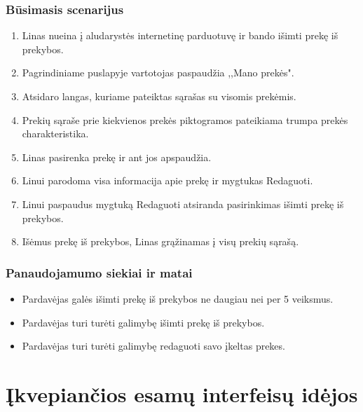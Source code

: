 \documentclass[oneside]{VUMIFPSkursinis}
\begin{document}
		\subsubsection{Būsimasis scenarijus}
			\begin{enumerate}
				\item{Linas nueina į aludarystės internetinę parduotuvę ir bando išimti prekę iš prekybos.}
				\item{Pagrindiniame puslapyje vartotojas paspaudžia ,,Mano prekės".}
				\item{Atsidaro langas, kuriame pateiktas sąrašas su visomis prekėmis.}
				\item{Prekių sąraše prie kiekvienos prekės piktogramos pateikiama trumpa prekės charakteristika.}
				\item{Linas pasirenka prekę ir ant jos apspaudžia.}
				\item{Linui parodoma visa informacija apie prekę ir mygtukas Redaguoti.}
				\item{Linui paspaudus mygtuką Redaguoti atsiranda pasirinkimas išimti prekę iš prekybos.}
				\item{Išėmus prekę iš prekybos, Linas grąžinamas į visų prekių sąrašą.}
			\end{enumerate}
		\subsubsection{Panaudojamumo siekiai ir matai}
			\begin{itemize}
				\item{Pardavėjas galės išimti prekę iš prekybos ne daugiau nei per 5 veiksmus.}
				\item{Pardavėjas turi turėti galimybę išimti prekę iš prekybos.}
				\item{Pardavėjas turi turėti galimybę redaguoti savo įkeltas prekes.}
			\end{itemize}
\section{Įkvepiančios esamų interfeisų idėjos}
\end{document}
